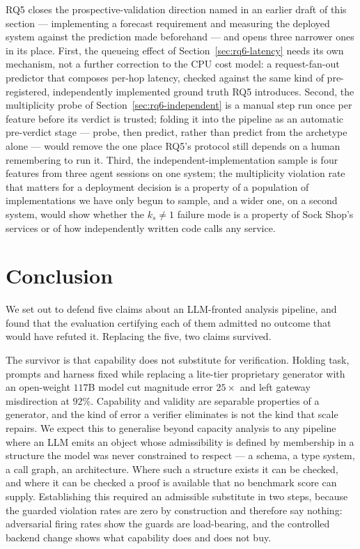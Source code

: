 \documentclass[journal, 10pt]{IEEEtran}
\begin{document}
RQ5 closes the prospective-validation direction named in an earlier draft of
this section --- implementing a forecast requirement and measuring the
deployed system against the prediction made beforehand --- and opens three
narrower ones in its place. First, the queueing effect of
Section~\ref{sec:rq6-latency} needs its own mechanism, not a further correction
to the CPU cost model: a request-fan-out predictor that composes per-hop
latency, checked against the same kind of pre-registered, independently
implemented ground truth RQ5 introduces. Second, the multiplicity probe of
Section~\ref{sec:rq6-independent} is a manual step run once per feature before
its verdict is trusted; folding it into the pipeline as an automatic
pre-verdict stage --- probe, then predict, rather than predict from the
archetype alone --- would remove the one place RQ5's protocol still depends on
a human remembering to run it. Third, the independent-implementation sample is
four features from three agent sessions on one system; the multiplicity
violation rate that matters for a deployment decision is a property of a
population of implementations we have only begun to sample, and a wider one,
on a second system, would show whether the $k_s\neq1$ failure mode is a
property of Sock Shop's services or of how independently written code calls
any service.


\section{Conclusion}
\label{sec:conclusion}
We set out to defend five claims about an LLM-fronted analysis pipeline, and
found that the evaluation certifying each of them admitted no outcome that would
have refuted it. Replacing the five, two claims survived.

The survivor is that capability does not substitute for verification. Holding
task, prompts and harness fixed while replacing a lite-tier proprietary generator
with an open-weight $117$B model cut magnitude error $25{\times}$ and left gateway
misdirection at $92\%$. Capability and validity are separable properties of a
generator, and the kind of error a verifier eliminates is not the kind that scale
repairs. We expect this to generalise beyond capacity analysis to any pipeline
where an LLM emits an object whose admissibility is defined by membership in a
structure the model was never constrained to respect --- a schema, a type system,
a call graph, an architecture. Where such a structure exists it can be checked,
and where it can be checked a proof is available that no benchmark score can
supply. Establishing this required an admissible substitute in two steps, because
the guarded violation rates are zero by construction and therefore say nothing:
adversarial firing rates show the guards are load-bearing, and the controlled
backend change shows what capability does and does not buy.
\end{document}
